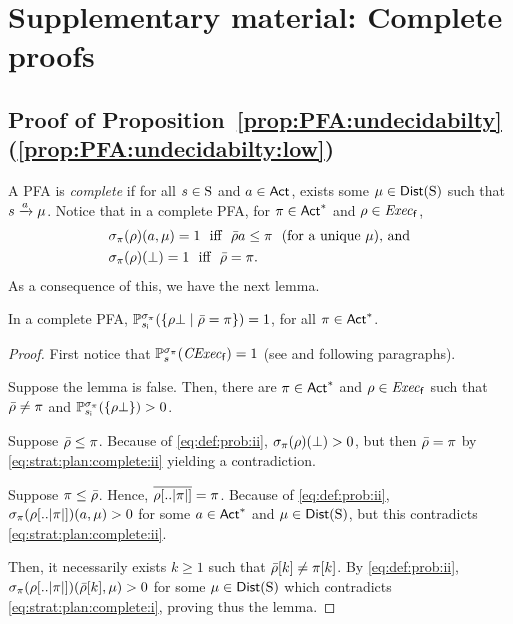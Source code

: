 
\section*{Supplementary material: Complete proofs}

\subsection{Proof of Proposition~\ref{prop:PFA:undecidabilty} (\cref{prop:PFA:undecidabilty:low})}\label{proof:prop:PFA:undecidabilty:low}

A PFA is \emph{complete} if for all $s\in\S$ and $a\in\Act$, exists
some $\mu\in\Dist(\S)$ such that $s\reach{a}\mu$.
%
Notice that in a complete PFA, for $\plan\in\Act^*$ and
$\rho\in\execf$,
\begin{align}
  &\strat_\plan(\rho)(a,\mu)=1 \text{ \ iff \ } \bar{\rho}a\leq\plan \text{ \ (for a unique } \mu \text{), and} \label{eq:strat:plan:complete:i}\\
  &\strat_\plan(\rho)(\complete)=1 \text{ \ iff \ } \bar{\rho}=\plan. \label{eq:strat:plan:complete:ii}
\end{align}
%
As a consequence of this, we have the next lemma.

\begin{lemma}\label{lm:strat:plan:complete}
  In a complete PFA,
  $\Prob_{\sini}^{\strat_\plan}(\{{\rho\complete}\mid{\bar{\rho}=\plan}\})=1$,
  for all $\plan\in\Act^*$.
\end{lemma}
%
\begin{proof}
  First notice that $\Prob^{\strat_\plan}_s(\cexecf)=1$ (see
   and following paragraphs).
  
  Suppose the lemma is false.  Then, there are $\plan\in\Act^*$ and
  $\rho\in\execf$ such that $\bar{\rho}\neq\plan$ and
  $\Prob_{\sini}^{\strat_\plan}(\{\rho\complete\})>0$.

  Suppose $\bar{\rho}\leq\plan$. Because of \cref{eq:def:prob:ii},
  $\strat_\plan(\rho)(\complete)> 0$, but then $\bar{\rho}=\plan$
  by \cref{eq:strat:plan:complete:ii} yielding a contradiction.

  Suppose $\plan\leq\bar{\rho}$. Hence,
  $\overline{\rho[..\size{\plan}]}=\plan$.  Because of
  \cref{eq:def:prob:ii}, $\strat_\plan(\rho[..\size{\plan}])(a,\mu)>0$
  for some $a\in\Act^*$ and $\mu\in\Dist(\S)$, but this contradicts
  \cref{eq:strat:plan:complete:ii}.

  Then, it necessarily exists $k\geq1$ such that
  $\bar{\rho}[k]\neq\plan[k]$.  By \cref{eq:def:prob:ii},
  $\strat_\plan(\rho[..\size{\plan}])(\bar{\rho}[k],\mu)>0$ for some
  $\mu\in\Dist(\S)$ which contradicts \cref{eq:strat:plan:complete:i},
  proving thus the lemma.
\end{proof}

